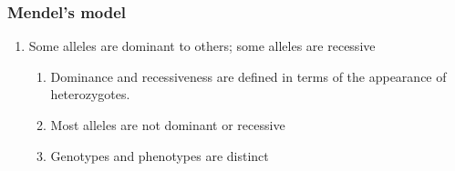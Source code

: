 \begin{frame}[t]
    \frametitle{Mendel's model}
    \begin{enumerate}[<+->]
        \addtocounter{enumi}{3}
        \item Some alleles are dominant to others; some alleles are recessive
            \vspace{4ex}
            \begin{enumerate}
                \item Dominance and recessiveness are defined 
                    in terms of the appearance of heterozygotes.
                \item Most alleles are not dominant or recessive
                \item Genotypes and phenotypes are distinct
            \end{enumerate}
    \end{enumerate}

\end{frame}

